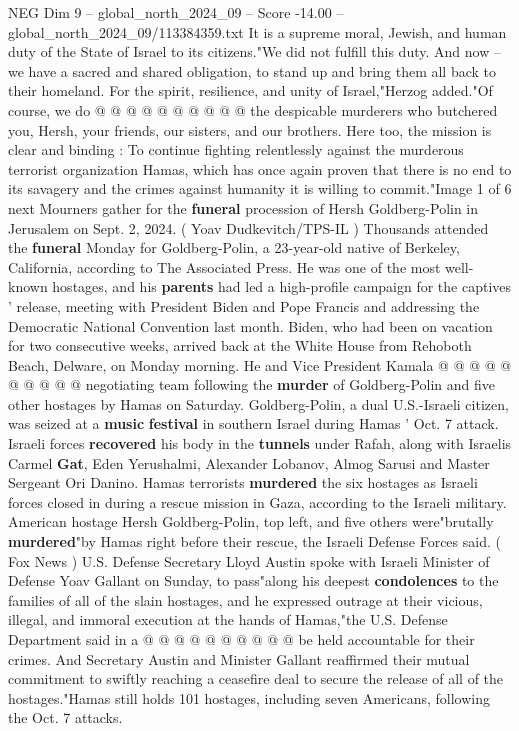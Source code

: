 \begin{textsample}{NEG Dim 9 – global\_north\_2024\_09 – Score -14.00 – global\_north\_2024\_09/113384359.txt}
It is a supreme moral, Jewish, and human duty of the State of Israel to its citizens."We did not fulfill this duty.
And now -- we have a sacred and shared obligation, to stand up and bring them all back to their homeland.
For the spirit, resilience, and unity of Israel,"Herzog added."Of course, we do @ @ @ @ @ @ @ @ @ @ the despicable murderers who butchered you, Hersh, your friends, our sisters, and our brothers.
Here too, the mission is clear and binding : To continue fighting relentlessly against the murderous terrorist organization Hamas, which has once again proven that there is no end to its savagery and the crimes against humanity it is willing to commit."Image 1 of 6 next Mourners gather for the \textbf{funeral} procession of Hersh Goldberg-Polin in Jerusalem on Sept. 2, 2024. ( Yoav Dudkevitch/TPS-IL ) Thousands attended the \textbf{funeral} Monday for Goldberg-Polin, a 23-year-old native of Berkeley, California, according to The Associated Press.
He was one of the most well-known hostages, and his \textbf{parents} had led a high-profile campaign for the captives ' release, meeting with President Biden and Pope Francis and addressing the Democratic National Convention last month.
Biden, who had been on vacation for two consecutive weeks, arrived back at the White House from Rehoboth Beach, Delware, on Monday morning.
He and Vice President Kamala @ @ @ @ @ @ @ @ @ @ negotiating team following the \textbf{murder} of Goldberg-Polin and five other hostages by Hamas on Saturday.
Goldberg-Polin, a dual U.S.-Israeli citizen, was seized at a \textbf{music} \textbf{festival} in southern Israel during Hamas ' Oct. 7 attack.
Israeli forces \textbf{recovered} his body in the \textbf{tunnels} under Rafah, along with Israelis Carmel \textbf{Gat}, Eden Yerushalmi, Alexander Lobanov, Almog Sarusi and Master Sergeant Ori Danino.
Hamas terrorists \textbf{murdered} the six hostages as Israeli forces closed in during a rescue mission in Gaza, according to the Israeli military.
American hostage Hersh Goldberg-Polin, top left, and five others were"brutally \textbf{murdered}"by Hamas right before their rescue, the Israeli Defense Forces said. ( Fox News ) U.S.
Defense Secretary Lloyd Austin spoke with Israeli Minister of Defense Yoav Gallant on Sunday, to pass"along his deepest \textbf{condolences} to the families of all of the slain hostages, and he expressed outrage at their vicious, illegal, and immoral execution at the hands of Hamas,"the U.S.
Defense Department said in a @ @ @ @ @ @ @ @ @ @ be held accountable for their crimes.
And Secretary Austin and Minister Gallant reaffirmed their mutual commitment to swiftly reaching a ceasefire deal to secure the release of all of the hostages."Hamas still holds 101 hostages, including seven Americans, following the Oct. 7 attacks.

\end{textsample}
